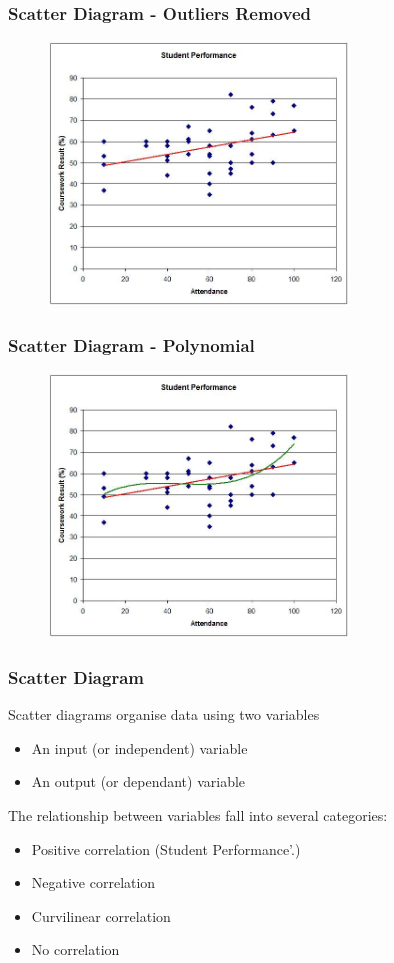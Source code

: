 \begin{frame}
\frametitle{Scatter Diagram - Outliers Removed}
\begin{figure}
	\centering
		\includegraphics[width = 8cm]{images/scattertrend2.jpg}
	\label{fig:studentc}
\end{figure}
\end{frame}






\begin{frame}
\frametitle{Scatter Diagram - Polynomial}
\begin{figure}
	\centering
		\includegraphics[width = 8cm]{images/scattertrend3.jpg}
	\label{fig:studentd}
\end{figure}
\end{frame}




\begin{frame}
\frametitle{Scatter Diagram}
Scatter diagrams organise data using two variables
\begin{itemize}
	\item An input (or independent) variable
	\item An output (or dependant) variable
\end{itemize}
The relationship between variables fall into several categories:
\begin{itemize}
	\item Positive correlation (Student Performance'.)
	\item Negative correlation
	\item Curvilinear correlation
	\item No correlation
\end{itemize}
\end{frame}





